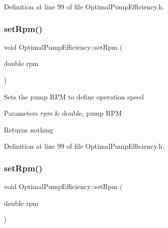 Definition at line 99 of file Optimal\+Pump\+Efficiency.\+h.

\mbox{\label{class_optimal_pump_efficiency_afc6b6f46b4e289efc8819249ad1c9fb5}} 
\subsubsection{\texorpdfstring{set\+Rpm()}{setRpm()}\hspace{0.1cm}{\footnotesize\ttfamily [2/3]}}
{\footnotesize\ttfamily void Optimal\+Pump\+Efficiency\+::set\+Rpm (\begin{DoxyParamCaption}\item[{double}]{rpm }\end{DoxyParamCaption})\hspace{0.3cm}{\ttfamily [inline]}}

Sets the pump R\+PM to define operation speed


\begin{DoxyParams}{Parameters}
{\em rpm} & double, pump R\+PM\\
\hline
\end{DoxyParams}
\begin{DoxyReturn}{Returns}
nothing 
\end{DoxyReturn}


Definition at line 99 of file Optimal\+Pump\+Efficiency.\+h.

\mbox{\label{class_optimal_pump_efficiency_afc6b6f46b4e289efc8819249ad1c9fb5}} 
\subsubsection{\texorpdfstring{set\+Rpm()}{setRpm()}\hspace{0.1cm}{\footnotesize\ttfamily [3/3]}}
{\footnotesize\ttfamily void Optimal\+Pump\+Efficiency\+::set\+Rpm (\begin{DoxyParamCaption}\item[{double}]{rpm }\end{DoxyParamCaption})\hspace{0.3cm}{\ttfamily [inline]}}

